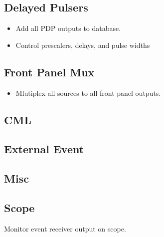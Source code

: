 \documentclass[a4paper,10pt]{article}
\begin{document}
	\subsection{Delayed Pulsers}
	\begin{itemize}
		\item Add all PDP outputs to database.
		\item Control prescalers, delays, and pulse widths
	\end{itemize}

	\subsection{Front Panel Mux}
	\begin{itemize}
		\item Mlutiplex all sources to all front panel outputs.
	\end{itemize}

	\subsection{CML}
	\subsection{External Event}
	\subsection{Misc}

	\subsection{Scope}
	Monitor event receiver output on scope.
\end{document}
